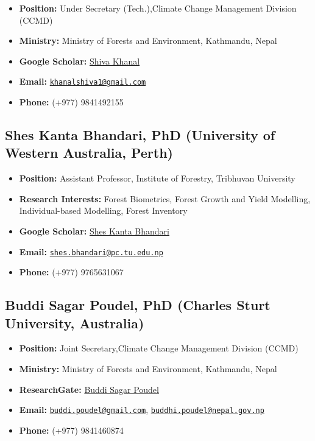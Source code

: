 \documentclass[
]{article}
\providecommand{\tightlist}{%
  \setlength{\itemsep}{0pt}\setlength{\parskip}{0pt}}
\begin{document}
\begin{itemize}
\tightlist
\item
  \textbf{Position:} Under Secretary (Tech.),Climate Change Management
  Division (CCMD)
\item
  \textbf{Ministry:} Ministry of Forests and Environment, Kathmandu,
  Nepal
\item
  \textbf{Google Scholar:}
  \href{https://scholar.google.com/citations?user=XXXXXXXXXXXX}{Shiva
  Khanal}
\item
  \textbf{Email:}
  \href{mailto:khanalshiva1@gmail.com}{\nolinkurl{khanalshiva1@gmail.com}}
\item
  \textbf{Phone:} (+977) 9841492155
\end{itemize}

\subsection{Shes Kanta Bhandari, PhD (University of Western Australia,
Perth)}\label{shes-kanta-bhandari-phd-university-of-western-australia-perth}

\begin{itemize}
\tightlist
\item
  \textbf{Position:} Assistant Professor, Institute of Forestry,
  Tribhuvan University
\item
  \textbf{Research Interests:} Forest Biometrics, Forest Growth and
  Yield Modelling, Individual-based Modelling, Forest Inventory
\item
  \textbf{Google Scholar:}
  \href{https://scholar.google.com/citations?user=k9sUEZkAAAAJ}{Shes
  Kanta Bhandari}
\item
  \textbf{Email:}
  \href{mailto:shes.bhandari@pc.tu.edu.np}{\nolinkurl{shes.bhandari@pc.tu.edu.np}}
\item
  \textbf{Phone:} (+977) 9765631067
\end{itemize}

\subsection{Buddi Sagar Poudel, PhD (Charles Sturt University,
Australia)}\label{buddi-sagar-poudel-phd-charles-sturt-university-australia}

\begin{itemize}
\tightlist
\item
  \textbf{Position:} Joint Secretary,Climate Change Management Division
  (CCMD)
\item
  \textbf{Ministry:} Ministry of Forests and Environment, Kathmandu,
  Nepal
\item
  \textbf{ResearchGate:}
  \href{https://www.researchgate.net/profile/Buddi-Poudel}{Buddi Sagar
  Poudel}
\item
  \textbf{Email:}
  \href{mailto:buddi.poudel@gmail.com}{\nolinkurl{buddi.poudel@gmail.com}},
  \href{mailto:buddhi.poudel@nepal.gov.np}{\nolinkurl{buddhi.poudel@nepal.gov.np}}
\item
  \textbf{Phone:} (+977) 9841460874
\end{itemize}
\end{document}
